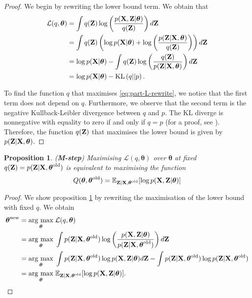 \documentclass[11pt]{article}
\numberwithin{equation}{section}
\newcommand{\argmax}[1]{\underset{#1}{\operatorname{arg}\,\operatorname{max}}\;}
\newcommand{\KL}[2]{\text{KL}\left(#1 \vert\vert #2\right)}
\newcommand{\X}{{\bf X}}
\newcommand{\Z}{{\bf Z}}
\newtheorem{proposition}{Proposition}[section]
\begin{document}
\begin{proof}
	We begin by rewriting the lower bound term. We obtain that
	\begin{align}
		\mathcal{L}(q, \boldsymbol\theta) &= \int q(\Z)\log\left(\frac{p(\X, \Z \vert \boldsymbol\theta)}{q(\Z)}\right) d{\bf Z}\\
		&= \int q(\Z) \left(\log p(\X\vert\boldsymbol\theta) + \log\left( \frac{p(\Z \vert \X, \boldsymbol\theta)}{q(\Z)} \right) \right) d\Z\\
		&= \log p(\X \vert \boldsymbol{\theta}) - \int q(\Z) \log\left(\frac{q(\Z)}{p(\Z \vert \X, \boldsymbol\theta)}\right) d\Z\\
		&= \log p(\X \vert \boldsymbol\theta) - \KL{q}{p}. \label{eq:part-L-rewrite}
	\end{align}
	
	To find the function $q$ that maximises \eqref{eq:part-L-rewrite}, we notice that the first term does not depend on $q$. Furthermore, we observe that the second term is the negative Kullback-Leibler divergence between $q$ and $p$. The KL diverge is nonnegative with equality to zero if and only if $q=p$   (for a proof, see \cite{pml1Book}). Therefore, the function $q(\Z)$ that maximises the lower bound is given by $p(\Z \vert \X, \boldsymbol\theta)$.
\end{proof}

\begin{proposition}\label{prop:m-step}
	(\textbf{M-step}) Maximising $\mathcal{L}(q, \boldsymbol{\theta})$ over $\boldsymbol{\theta}$ at fixed $q({\bf Z}) = p({\bf Z} \vert {\bf X}, \boldsymbol\theta^\text{old})$ is equivalent to maximising the function
	\begin{equation}
		Q(\boldsymbol{\theta}, \boldsymbol{\theta}^\text{old}) = \mathbb{E}_{{\bf Z}\vert {\bf X}, \boldsymbol{\theta}^\text{old}}[\log p({\bf X}, {\bf Z}\vert \boldsymbol\theta)]
	\end{equation}
\end{proposition}

\begin{proof}
	We show proposition \ref{prop:m-step} by rewriting the maximisation of the lower bound with fixed $q$. We obtain
	\begin{align}
		\boldsymbol{\theta}^\text{new} &= \argmax{\boldsymbol\theta} \mathcal{L}(q, \boldsymbol\theta)\\
		&= \argmax{\boldsymbol{\theta}} \int p(\Z \vert \X, \boldsymbol{\theta}^\text{old}) \log\left(\frac{p(\X, \Z \vert \boldsymbol\theta)}{p(\Z \vert \X, \boldsymbol\theta^\text{old})}\right) d\Z\\
		&= \argmax{\boldsymbol{\theta}} \int p(\Z \vert \X, \boldsymbol{\theta} ^\text{old}) \log p(\X, \Z \vert \boldsymbol\theta) d\Z - \int p(\Z \vert \X, \boldsymbol{\theta}^\text{old}) \log p(\Z \vert \X, \boldsymbol{\theta}^\text{old})\\
		&= \argmax{\boldsymbol{\theta}} \mathbb{E}_{{\bf Z}\vert {\bf X}, \boldsymbol{\theta}^\text{old}}[\log p({\bf X}, {\bf Z}\vert \boldsymbol\theta)].
	\end{align}
\end{proof}
\end{document}
